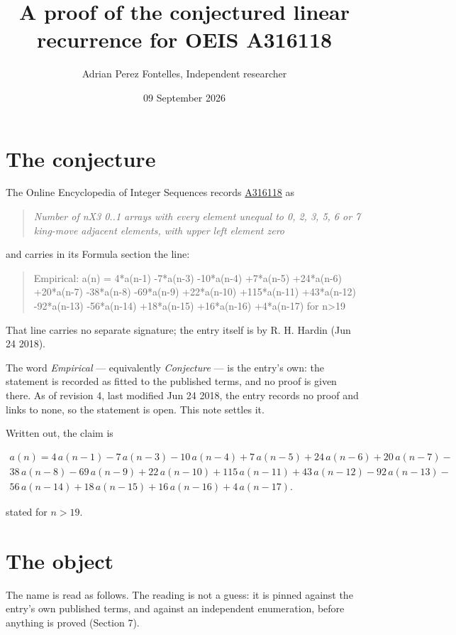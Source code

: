 \documentclass[11pt]{article}
\title{A proof of the conjectured linear recurrence for OEIS A316118}
\author{Adrian Perez Fontelles, Independent researcher}
\date{09 September 2026}
\theoremstyle{definition}
\begin{document}
\maketitle
\section{The conjecture}

The Online Encyclopedia of Integer Sequences records \href{https://oeis.org/A316118}{A316118} as

\begin{quote}\itshape Number of nX3 0..1 arrays with every element unequal to 0, 2, 3, 5, 6 or 7 king-move adjacent elements, with upper left element zero\end{quote}

and carries in its Formula section the line:

\begin{quote}\ttfamily Empirical: a(n) = 4*a(n-1) -7*a(n-3) -10*a(n-4) +7*a(n-5) +24*a(n-6) +20*a(n-7) -38*a(n-8) -69*a(n-9) +22*a(n-10) +115*a(n-11) +43*a(n-12) -92*a(n-13) -56*a(n-14) +18*a(n-15) +16*a(n-16) +4*a(n-17) for n>19\end{quote}

That line carries no separate signature; the entry itself is by R. H. Hardin (Jun 24 2018).

The word {\itshape Empirical} --- equivalently {\itshape Conjecture} --- is the entry's own: the statement is recorded as fitted to the published terms, and no proof is given there. As of revision 4, last modified Jun 24 2018, the entry records no proof and links to none, so the statement is open. This note settles it.

Written out, the claim is

\begin{multline*} a(n) = 4\,a(n-1) - 7\,a(n-3) - 10\,a(n-4) + 7\,a(n-5) + 24\,a(n-6) + 20\,a(n-7) - \\ 38\,a(n-8) - 69\,a(n-9) + 22\,a(n-10) + 115\,a(n-11) + 43\,a(n-12) - 92\,a(n-13) - \\ 56\,a(n-14) + 18\,a(n-15) + 16\,a(n-16) + 4\,a(n-17). \end{multline*}

stated for $n > 19$.

\section{The object}

The name is read as follows. The reading is not a guess: it is pinned against the entry's own published terms, and against an independent enumeration, before anything is proved (Section 7).
\end{document}
